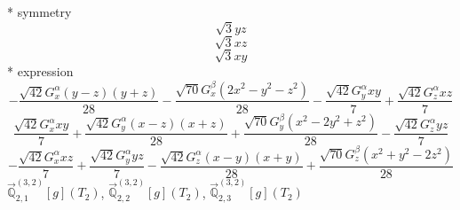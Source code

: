 \documentclass[fleqn,8pt]{jsarticle}
\begin{document}
\noindent\quad ** symmetry
\begin{dmath*}
\sqrt{3} y z
\end{dmath*}
\begin{dmath*}
\sqrt{3} x z
\end{dmath*}
\begin{dmath*}
\sqrt{3} x y
\end{dmath*}
\noindent\quad ** expression
\begin{dmath*}
- \frac{\sqrt{42} G_{x}^{\alpha} \left(y - z\right) \left(y + z\right)}{28} - \frac{\sqrt{70} G_{x}^{\beta} \left(2 x^{2} - y^{2} - z^{2}\right)}{28} - \frac{\sqrt{42} G_{y}^{\alpha} x y}{7} + \frac{\sqrt{42} G_{z}^{\alpha} x z}{7}
\end{dmath*}
\begin{dmath*}
\frac{\sqrt{42} G_{x}^{\alpha} x y}{7} + \frac{\sqrt{42} G_{y}^{\alpha} \left(x - z\right) \left(x + z\right)}{28} + \frac{\sqrt{70} G_{y}^{\beta} \left(x^{2} - 2 y^{2} + z^{2}\right)}{28} - \frac{\sqrt{42} G_{z}^{\alpha} y z}{7}
\end{dmath*}
\begin{dmath*}
- \frac{\sqrt{42} G_{x}^{\alpha} x z}{7} + \frac{\sqrt{42} G_{y}^{\alpha} y z}{7} - \frac{\sqrt{42} G_{z}^{\alpha} \left(x - y\right) \left(x + y\right)}{28} + \frac{\sqrt{70} G_{z}^{\beta} \left(x^{2} + y^{2} - 2 z^{2}\right)}{28}
\end{dmath*}
\noindent\quad $\vec{\mathbb{Q}}_{2,1}^{(3,2)}[g](T_{2})$, $\vec{\mathbb{Q}}_{2,2}^{(3,2)}[g](T_{2})$, $\vec{\mathbb{Q}}_{2,3}^{(3,2)}[g](T_{2})$
\end{document}
